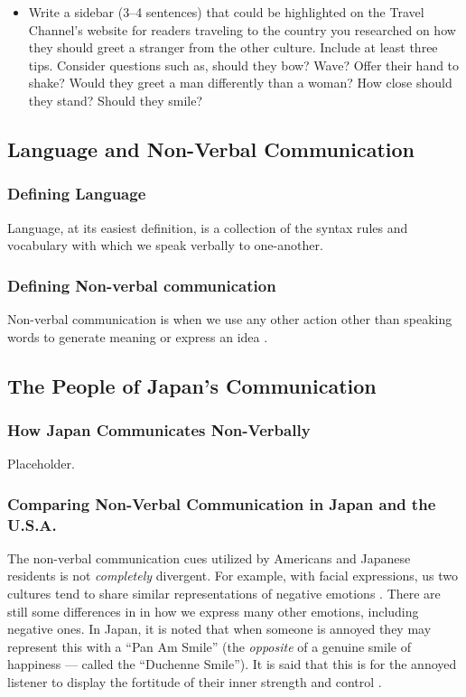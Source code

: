 \documentclass[stu,12pt]{apa7}
\begin{document}
\begin{enumerate}
\begin{itemize}
            \item Write a sidebar (3--4 sentences) that could be highlighted
              on the Travel Channel's website for readers traveling to the
              country you researched on how they should greet a stranger from
              the other culture. Include at least three tips. Consider
              questions such as, should they bow? Wave? Offer their hand to
              shake? Would they greet a man differently than a woman? How
              close should they stand? Should they smile?
          \end{itemize}
      \end{enumerate}


    \newpage
    \subsection{Language and Non-Verbal Communication}
      \subsubsection{Defining Language}
        Language, at its easiest definition, is a collection of the syntax
          rules and vocabulary with which we speak verbally to one-another.
      \subsubsection{Defining Non-verbal communication}
        Non-verbal communication is when we use any other action other than
          speaking words to generate meaning or express an idea
          \parencite[pp. 224]{noauthor_communication_2013}.

    \subsection{The People of Japan's Communication}
      \subsubsection{How Japan Communicates Non-Verbally}
        Placeholder.
      \subsubsection{Comparing Non-Verbal Communication in Japan and the U.S.A.}
        The non-verbal communication cues utilized by Americans and Japanese
          residents is not \textit{completely} divergent. For example, with
          facial expressions, us two cultures tend to share similar
          representations of negative emotions
          \parencite[pp. 75]{lafrance_cultural_1978}. There are still some
          differences in in how we express many other emotions, including
          negative ones. In Japan, it is noted that when someone is annoyed
          they may represent this with a ``Pan Am Smile'' (the
          \textit{opposite} of a genuine smile of happiness --- called the
          ``Duchenne Smile''). It is said that this is for the annoyed listener
          to display the fortitude of their inner strength and control
          \parencite[pp. 76]{lafrance_cultural_1978}.
\end{document}
